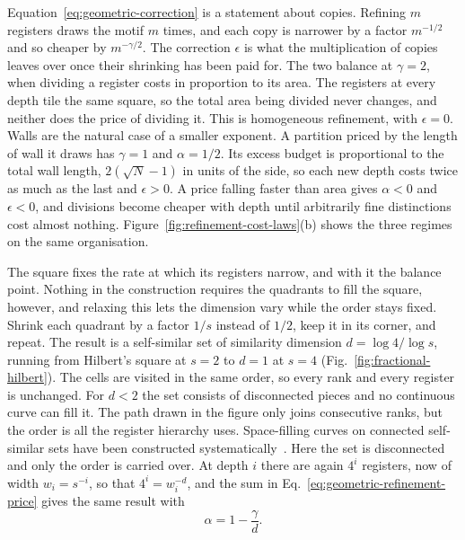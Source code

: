 Equation~\eqref{eq:geometric-correction} is a statement about copies.
Refining $m$ registers draws the motif $m$ times, and each copy is
narrower by a factor $m^{-1/2}$ and so cheaper by $m^{-\gamma/2}$. The
correction $\epsilon$ is what the multiplication of copies leaves over
once their shrinking has been paid for. The two balance at $\gamma=2$,
when dividing a register costs in proportion to its area. The registers
at every depth tile the same square, so the total area being divided
never changes, and neither does the price of dividing it. This is
homogeneous refinement, with $\epsilon=0$. Walls are the natural case
of a smaller exponent. A partition priced by the length of wall it
draws has $\gamma=1$ and $\alpha=1/2$. Its excess budget is
proportional to the total wall length, $2(\sqrt N-1)$ in units of the
side, so each new depth costs twice as much as the last and
$\epsilon>0$. A price falling faster than area gives $\alpha<0$ and
$\epsilon<0$, and divisions become cheaper with depth until arbitrarily
fine distinctions cost almost nothing.
Figure~\ref{fig:refinement-cost-laws}(b) shows the three regimes on the
same organisation.

The square fixes the rate at which its registers narrow, and with it
the balance point. Nothing in the construction requires the quadrants
to fill the square, however, and relaxing this lets the dimension vary
while the order stays fixed. Shrink each quadrant by a factor $1/s$
instead of $1/2$, keep it in its corner, and repeat. The result is a
self-similar set of similarity dimension $d=\log4/\log s$, running from
Hilbert's square at $s=2$ to $d=1$ at $s=4$
(Fig.~\ref{fig:fractional-hilbert}). The cells are visited in the same
order, so every rank and every register is unchanged. For $d<2$ the set
consists of disconnected pieces and no continuous curve can fill it.
The path drawn in the figure only joins consecutive ranks, but the
order is all the register hierarchy uses. Space-filling curves on
connected self-similar sets have been constructed
systematically~\cite{rao2016spacefilling}. Here the set is disconnected
and only the order is carried over. At depth $i$ there are again $4^i$
registers, now of width $w_i=s^{-i}$, so that $4^i=w_i^{-d}$, and the
sum in Eq.~\eqref{eq:geometric-refinement-price} gives the same result
with
\begin{equation}
  \alpha=1-\frac{\gamma}{d}.
  \label{eq:geometric-exponent}
\end{equation}

